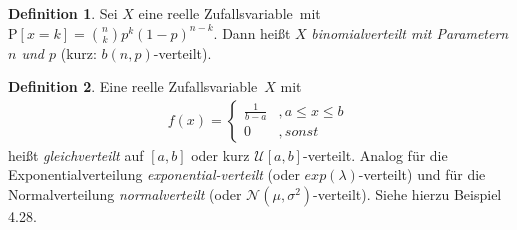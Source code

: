 \documentclass[a4paper,12pt,fleqn]{scrartcl}
\newcommand{\m}[1]{\mathcal{ #1 }}
\newcommand{\ZV}{Zufallsvariable}
\theoremstyle{definition}
\newtheorem{definition}{Definition}[section]
\theoremstyle{plain}
\theoremstyle{remark}
\begin{document}
\begin{definition}
Sei $X$ eine reelle \ZV \, mit $\text{P}[x = k] = \binom{n}{k} p^k (1-p)^{n-k}$. Dann heißt $X$ \emph{binomialverteilt mit Parametern $n$ und $p$} (kurz: $b(n,p)$-verteilt).
\end{definition}
\begin{definition}
Eine reelle \ZV \, $X$ mit
 \begin{align*}
f(x)=\begin{cases}\frac{1}{b-a}&,a\leq x\leq b\\
0&,sonst
\end{cases}\
\end{align*}
heißt \emph{gleichverteilt} auf $[a,b]$ oder kurz $\m{U}[a,b]$-verteilt. Analog für die Exponentialverteilung \emph{exponential-verteilt} (oder $exp(\lambda)$-verteilt) und für die Normalverteilung \emph{normalverteilt} (oder $ \m{N}( \mu , \sigma^2)$-verteilt). Siehe hierzu Beispiel 4.28.
\end{definition}
\end{document}

